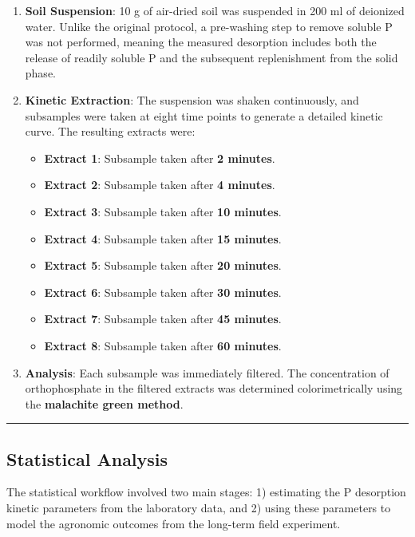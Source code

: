 \documentclass[
  letterpaper,
  DIV=11,
  numbers=noendperiod]{scrartcl}
\providecommand{\tightlist}{%
  \setlength{\itemsep}{0pt}\setlength{\parskip}{0pt}}\usepackage{longtable,booktabs,array}
\begin{document}
\begin{enumerate}
\def\labelenumi{\arabic{enumi}.}
\item
  \textbf{Soil Suspension}: 10 g of air-dried soil was suspended in 200
  ml of deionized water. Unlike the original protocol, a pre-washing
  step to remove soluble P was not performed, meaning the measured
  desorption includes both the release of readily soluble P and the
  subsequent replenishment from the solid phase.
\item
  \textbf{Kinetic Extraction}: The suspension was shaken continuously,
  and subsamples were taken at eight time points to generate a detailed
  kinetic curve. The resulting extracts were:

  \begin{itemize}
  \tightlist
  \item
    \textbf{Extract 1}: Subsample taken after \textbf{2 minutes}.
  \item
    \textbf{Extract 2}: Subsample taken after \textbf{4 minutes}.
  \item
    \textbf{Extract 3}: Subsample taken after \textbf{10 minutes}.
  \item
    \textbf{Extract 4}: Subsample taken after \textbf{15 minutes}.
  \item
    \textbf{Extract 5}: Subsample taken after \textbf{20 minutes}.
  \item
    \textbf{Extract 6}: Subsample taken after \textbf{30 minutes}.
  \item
    \textbf{Extract 7}: Subsample taken after \textbf{45 minutes}.
  \item
    \textbf{Extract 8}: Subsample taken after \textbf{60 minutes}.
  \end{itemize}
\item
  \textbf{Analysis}: Each subsample was immediately filtered. The
  concentration of orthophosphate in the filtered extracts was
  determined colorimetrically using the \textbf{malachite green method}.
\end{enumerate}

\begin{center}\rule{0.5\linewidth}{0.5pt}\end{center}

\subsection{Statistical Analysis}\label{statistical-analysis}

The statistical workflow involved two main stages: 1) estimating the P
desorption kinetic parameters from the laboratory data, and 2) using
these parameters to model the agronomic outcomes from the long-term
field experiment.
\end{document}
